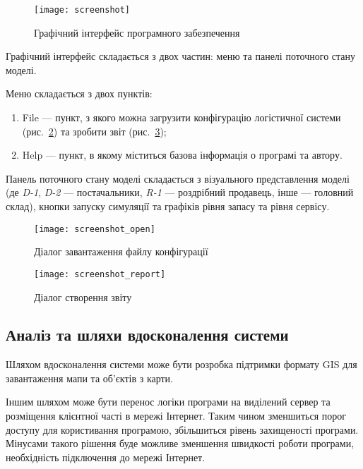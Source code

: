 \begin{figure}[H]
	\centering
	\texttt{[image: screenshot]}
	\caption{Графічний інтерфейс програмного забезпечення}
	\label{fig:screenshot}
\end{figure} 

Графічний інтерфейс складається з двох частин: меню та панелі поточного стану моделі.

Меню складається з двох пунктів:
\begin{enumerate}[label={\arabic*)}]
	\item File --- пункт, з якого можна загрузити конфігурацію логістичної системи (рис.~\ref{fig:screenshot_open}) та зробити звіт (рис.~\ref{fig:screenshot_report});
	\item Help --- пункт, в якому міститься базова інформація о програмі та автору.
\end{enumerate} 

Панель поточного стану моделі складається з візуального представлення моделі (де \textit{D-1}, \textit{D-2} --- постачальники, \textit{R-1} --- роздрібний продавець, інше --- головний склад), кнопки запуску симуляції та графіків рівня запасу та рівня сервісу.

\begin{figure}[H]
	\centering
	\texttt{[image: screenshot\_open]}
	\caption{Діалог завантаження файлу конфігурації}
	\label{fig:screenshot_open}
\end{figure}

\begin{figure}[H]
	\centering
	\texttt{[image: screenshot\_report]}
	\caption{Діалог створення звіту}
	\label{fig:screenshot_report}
\end{figure} 

\subsection{Аналіз та шляхи вдосконалення системи}
Шляхом вдосконалення системи може бути розробка підтримки формату GIS для завантаження мапи та об'єктів з карти.

Іншим шляхом може бути перенос логіки програми на виділений сервер та розміщення клієнтної часті в мережі Інтернет.
Таким чином зменшиться порог доступу для користивання програмою, збільшиться рівень захищеності програми.
Мінусами такого рішення буде можливе зменшення швидкості роботи програми, необхідність підключення до мережі Інтернет.
